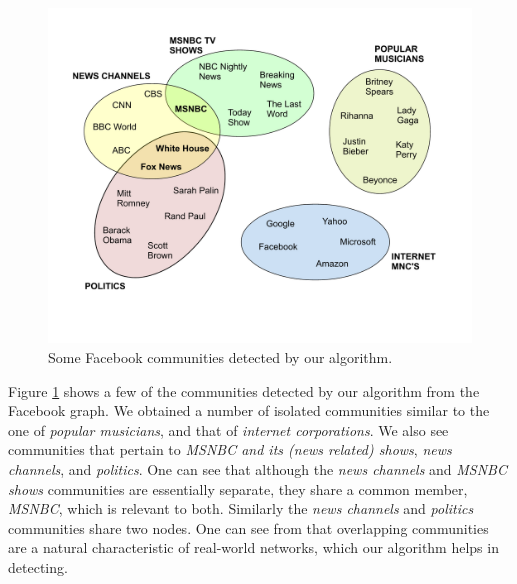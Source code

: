 %


\begin{figure}%
  \centering
    \includegraphics[scale=0.5]{communities_fb.pdf}
    
  \caption{Some Facebook communities detected by our algorithm.}
\label{fig-communities-fb}
\end{figure}

Figure \ref{fig-communities-fb} shows a few of the communities detected by our algorithm from the Facebook graph. We obtained a number of isolated communities similar to the one of {\it popular musicians}, and that of {\it internet corporations}. We also see communities that pertain to {\it MSNBC and its (news related) shows}, {\it news channels}, and {\it politics}. One can see that although the {\it news channels} and {\it MSNBC shows} communities are essentially separate, they share a common member, {\it MSNBC}, which is relevant to both. Similarly the {\it news channels} and {\it politics} communities share two nodes. One can see from that overlapping communities are a natural characteristic of real-world networks, which our algorithm helps in detecting.


